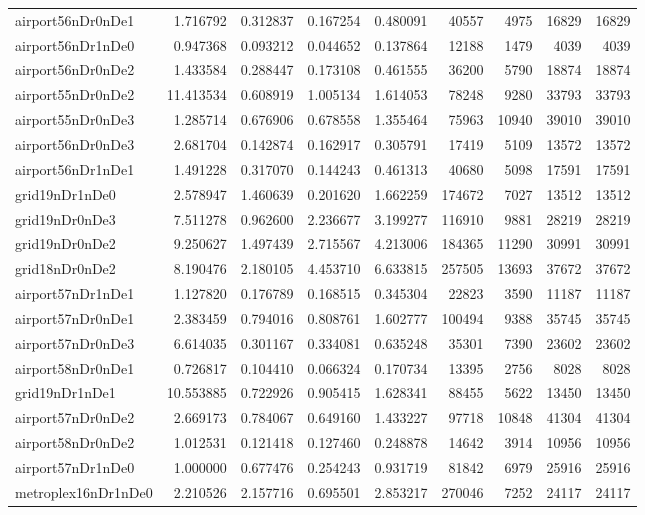 \begin{longtable}{|l|r|r|r|r|r|r|r|r|}
airport56nDr0nDe1 & 1.716792 & 0.312837 & 0.167254 & 0.480091 & 40557 & 4975 & 16829 & 16829 \\
airport56nDr1nDe0 & 0.947368 & 0.093212 & 0.044652 & 0.137864 & 12188 & 1479 & 4039 & 4039 \\
airport56nDr0nDe2 & 1.433584 & 0.288447 & 0.173108 & 0.461555 & 36200 & 5790 & 18874 & 18874 \\
airport55nDr0nDe2 & 11.413534 & 0.608919 & 1.005134 & 1.614053 & 78248 & 9280 & 33793 & 33793 \\
airport55nDr0nDe3 & 1.285714 & 0.676906 & 0.678558 & 1.355464 & 75963 & 10940 & 39010 & 39010 \\
airport56nDr0nDe3 & 2.681704 & 0.142874 & 0.162917 & 0.305791 & 17419 & 5109 & 13572 & 13572 \\
airport56nDr1nDe1 & 1.491228 & 0.317070 & 0.144243 & 0.461313 & 40680 & 5098 & 17591 & 17591 \\
grid19nDr1nDe0 & 2.578947 & 1.460639 & 0.201620 & 1.662259 & 174672 & 7027 & 13512 & 13512 \\
grid19nDr0nDe3 & 7.511278 & 0.962600 & 2.236677 & 3.199277 & 116910 & 9881 & 28219 & 28219 \\
grid19nDr0nDe2 & 9.250627 & 1.497439 & 2.715567 & 4.213006 & 184365 & 11290 & 30991 & 30991 \\
grid18nDr0nDe2 & 8.190476 & 2.180105 & 4.453710 & 6.633815 & 257505 & 13693 & 37672 & 37672 \\
airport57nDr1nDe1 & 1.127820 & 0.176789 & 0.168515 & 0.345304 & 22823 & 3590 & 11187 & 11187 \\
airport57nDr0nDe1 & 2.383459 & 0.794016 & 0.808761 & 1.602777 & 100494 & 9388 & 35745 & 35745 \\
airport57nDr0nDe3 & 6.614035 & 0.301167 & 0.334081 & 0.635248 & 35301 & 7390 & 23602 & 23602 \\
airport58nDr0nDe1 & 0.726817 & 0.104410 & 0.066324 & 0.170734 & 13395 & 2756 & 8028 & 8028 \\
grid19nDr1nDe1 & 10.553885 & 0.722926 & 0.905415 & 1.628341 & 88455 & 5622 & 13450 & 13450 \\
airport57nDr0nDe2 & 2.669173 & 0.784067 & 0.649160 & 1.433227 & 97718 & 10848 & 41304 & 41304 \\
airport58nDr0nDe2 & 1.012531 & 0.121418 & 0.127460 & 0.248878 & 14642 & 3914 & 10956 & 10956 \\
airport57nDr1nDe0 & 1.000000 & 0.677476 & 0.254243 & 0.931719 & 81842 & 6979 & 25916 & 25916 \\
metroplex16nDr1nDe0 & 2.210526 & 2.157716 & 0.695501 & 2.853217 & 270046 & 7252 & 24117 & 24117 \\

\end{longtable}
